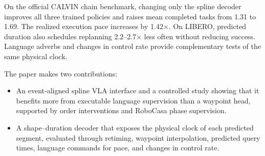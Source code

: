 On the official CALVIN chain benchmark, changing only the spline decoder improves all three trained policies and raises mean completed tasks from 1.31 to 1.69. The realized execution pace increases by 1.42$\times$. On LIBERO, predicted duration also schedules replanning 2.2--2.7$\times$ less often without reducing success. Language adverbs and changes in control rate provide complementary tests of the same physical clock.

The paper makes two contributions:
\begin{itemize}
\item An event-aligned spline VLA interface and a controlled study showing that it benefits more from executable language supervision than a waypoint head, supported by order interventions and RoboCasa phase supervision.
\item A shape--duration decoder that exposes the physical clock of each predicted segment, evaluated through retiming, waypoint interpolation, predicted query times, language commands for pace, and changes in control rate.
\end{itemize}
